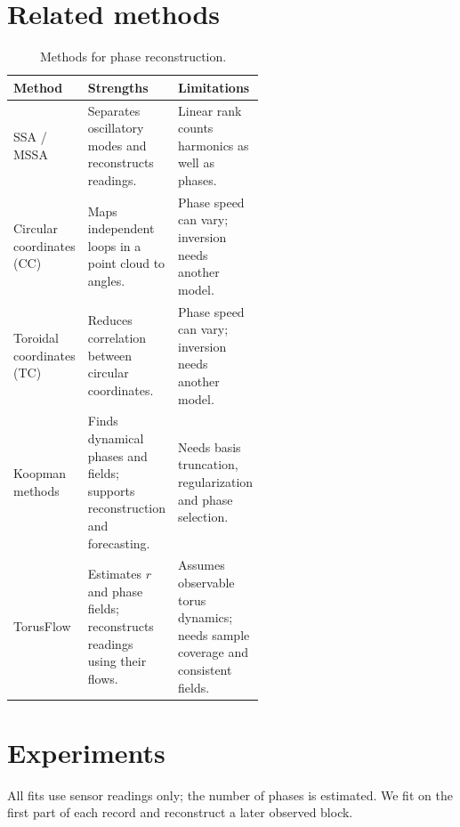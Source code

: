 \documentclass[11pt,a4paper]{article}
\begin{document}
\section*{Related methods}

\begin{table}[H]
\centering
\caption{Methods for phase reconstruction.}
\label{tab:method-comparison}
\begingroup
\normalsize
\setlength{\tabcolsep}{6pt}
\setlength{\parskip}{0pt}
\renewcommand{\arraystretch}{1.15}
\begin{tabular}{@{}
  >{\raggedright\arraybackslash}p{0.23\linewidth}
  >{\raggedright\arraybackslash}p{0.33\linewidth}
  >{\raggedright\arraybackslash}p{}
  @{}}
\toprule
\textbf{Method} & \textbf{Strengths} & \textbf{Limitations} \\
\midrule
SSA / MSSA\par
\citep{BroomheadKing1986,GrothGhil2011}
& Separates oscillatory modes and reconstructs readings.
& Linear rank counts harmonics as well as phases. \\
\addlinespace[8pt]
Circular coordinates (CC)\par
\citep{deSilva2011}
& Maps independent loops in a point cloud to angles.
& Phase speed can vary; inversion needs another model. \\
\addlinespace[8pt]
Toroidal coordinates (TC)\par
\citep{Scoccola2023}
& Reduces correlation between circular coordinates.
& Phase speed can vary; inversion needs another model. \\
\addlinespace[8pt]
Koopman methods\par
\citep{Giannakis2019}
& Finds dynamical phases and fields; supports reconstruction and forecasting.
& Needs basis truncation, regularization and phase selection. \\
\addlinespace[8pt]
TorusFlow
& Estimates $r$ and phase fields; reconstructs readings using their flows.
& Assumes observable torus dynamics; needs sample coverage and consistent fields. \\
\bottomrule
\end{tabular}
\endgroup
\end{table}

\section*{Experiments}
All fits use sensor readings only; the number of phases is estimated.
We fit on the first part of each record and reconstruct a later observed
block.
\end{document}
